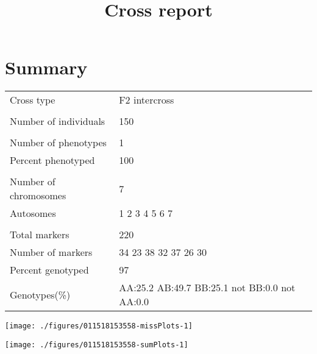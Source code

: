 \documentclass[a4paper,11pt]{article}\usepackage[]{graphicx}\usepackage[]{color}
\title{Cross report}%
\author{\vspace{-5ex}}
\date{\vspace{-5ex}}
\newenvironment{knitrout}{}{} %
\begin{document}


\maketitle
\singlespacing

\section{Summary}
\begin{table}[ht]
\begin{flushleft}
\begin{tabular}{ll}
  Cross type & F2 intercross \\ 
   &  \\ 
  Number of individuals & 150 \\ 
   &  \\ 
  Number of phenotypes & 1 \\ 
  Percent phenotyped & 100 \\ 
   &  \\ 
  Number of chromosomes & 7 \\ 
    Autosomes & 1 2 3 4 5 6 7 \\ 
   &  \\ 
  Total markers & 220 \\ 
  Number of markers & 34 23 38 32 37 26 30 \\ 
  Percent genotyped & 97 \\ 
  Genotypes(\%) & AA:25.2 AB:49.7 BB:25.1 not BB:0.0 not AA:0.0 \\ 
  \end{tabular}
\label{summary}
\end{flushleft}
\end{table}

\begin{knitrout}
\color{fgcolor}
\texttt{[image: ./figures/011518153558-missPlots-1]} 

\end{knitrout}
\begin{knitrout}
\color{fgcolor}
\texttt{[image: ./figures/011518153558-sumPlots-1]} 

\end{knitrout}
\end{document}
